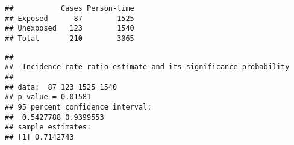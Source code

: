 \documentclass[
]{article}
\begin{document}
\begin{verbatim}
##           Cases Person-time
## Exposed      87        1525
## Unexposed   123        1540
## Total       210        3065
\end{verbatim}

\begin{verbatim}
## 
##  Incidence rate ratio estimate and its significance probability
## 
## data:  87 123 1525 1540
## p-value = 0.01581
## 95 percent confidence interval:
##  0.5427788 0.9399553
## sample estimates:
## [1] 0.7142743
\end{verbatim}
\end{document}
